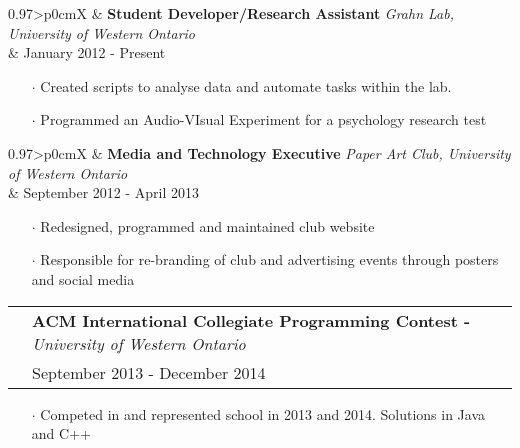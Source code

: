 \documentclass[letterpaper, oneside, final]{scrartcl} %
\newcommand{\gray}{\rowcolor[gray]{.90}} %
\begin{document}
\begin{center}
\vspace{-0.05cm}

\begin{tabularx}{0.97\linewidth}{>{\raggedleft\scshape}p{0cm}X}
\gray & \textbf{Student Developer/Research Assistant} \textit{Grahn Lab, University of Western Ontario}\\
\gray & {January 2012 - Present}\\
\end{tabularx}
\vspace{-0.1cm}
\begin{itemize} \itemsep-0.2cm
\item[$\cdot$] Created scripts to analyse data and automate tasks within the lab.
\item[$\cdot$] Programmed an Audio-VIsual Experiment for a psychology research test\\
\end{itemize}

\vspace{-0.05cm}

\begin{tabularx}{0.97\linewidth}{>{\raggedleft\scshape}p{0cm}X}
\gray & \textbf{Media and Technology Executive} \textit{Paper Art Club, University of Western Ontario}\\
\gray & {September 2012 - April 2013}\\
\end{tabularx}
\vspace{-0.1cm}
\begin{itemize} \itemsep-0.2cm
\item[$\cdot$] Redesigned, programmed and maintained club website  \\
\item[$\cdot$] Responsible for re-branding of club and advertising events through posters and social media\\
\end{itemize}

\vspace{-0.05cm}

\begin{tabularx}{0.97\linewidth}{>{\raggedleft\scshape}p{0cm}X}
\gray & \textbf{ACM International Collegiate Programming Contest -} \textit{University of Western Ontario}\\
\gray & {September 2013 - December 2014}\	\
\end{tabularx}
\vspace{-0.1cm}
\begin{itemize} \itemsep-0.2cm
\item[$\cdot$] Competed in and represented school in 2013 and 2014. Solutions in Java and C++\\

\end{itemize}


\end{center}
\end{document}
